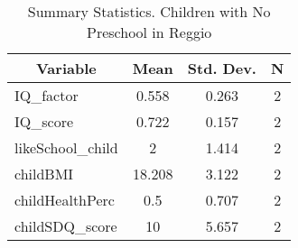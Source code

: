 
\begin{table}[htbp]\centering \caption{Summary Statistics. Children with No Preschool in Reggio \label{bothChildmaternaNoneReggio}}
\begin{tabular}{l c c  c}\hline\hline
\multicolumn{1}{c}{\textbf{Variable}} & \textbf{Mean}
 & \textbf{Std. Dev.} & \textbf{N}\\ \hline
IQ\_factor & 0.558 & 0.263  & 2\\
IQ\_score & 0.722 & 0.157  & 2\\
likeSchool\_child & 2 & 1.414  & 2\\
childBMI & 18.208 & 3.122  & 2\\
childHealthPerc & 0.5 & 0.707  & 2\\
childSDQ\_score & 10 & 5.657  & 2\\
\hline\end{tabular}
\end{table}
